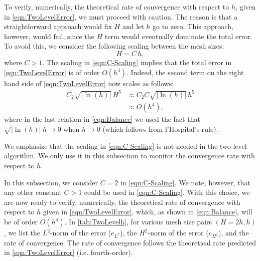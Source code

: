 To verify, numerically, the theoretical rate of convergence with respect to
$h$, given in \eqref{eqn:TwoLevelError}, we must proceed with caution. The reason is
that a straightforward approach would fix $H$ and let $h$ go to zero. This
approach, however, would fail, since the $H$ term would eventually dominate the
total error. To avoid this, we consider the following scaling between the mesh
sizes:
\begin{equation}
  H = C\, h,
  \label{eqn:C-Scaling}
\end{equation}
where $C>1$. The scaling in \eqref{eqn:C-Scaling} implies that the total error
in \eqref{eqn:TwoLevelError} is of order $O(h^4)$. Indeed, the second term on the
right hand side of \eqref{eqn:TwoLevelError} now scales as follows:
\begin{equation}
  \begin{split}
    C_2 \sqrt{|\ln(h)|}\, H^5 &\approx C_2 C \sqrt{|\ln(h)|}\, h^5 \\[0.2em]
    &\approx O(h^4),
  \end{split}
  \label{eqn:Balance}
\end{equation}
where in the last relation in \eqref{eqn:Balance} we used the fact that
$\sqrt{|\ln(h)|}\, h \rightarrow 0$ when $h \rightarrow 0$ (which follows from
l'Hospital's rule).

\begin{remark}
  We emphasize that the scaling in \eqref{eqn:C-Scaling} is not needed in the
  two-level algorithm. We only use it in this subsection to monitor the
  convergence rate with respect to $h$.
\end{remark}

In this subsection, we consider $C=2$ in \eqref{eqn:C-Scaling}. We note,
however, that any other constant $C>1$ could be used in \eqref{eqn:C-Scaling}.
With this choice, we are now ready to verify, numerically, the theoretical rate
of convergence with respect to $h$ given in \eqref{eqn:TwoLevelError}, which, as
shown in \eqref{eqn:Balance}, will be of order $O(h^4)$. In
\autoref{tab:TwoLevelh}, for various mesh size pairs $(H=2h, h)$, we list the
$L^2$-norm of the error ($e_{L^2}$), the $H^2$-norm of the error ($e_{H^2}$),
and the rate of convergence. The rate of convergence follows the theoretical
rate predicted in \eqref{eqn:TwoLevelError} (i.e. fourth-order).

